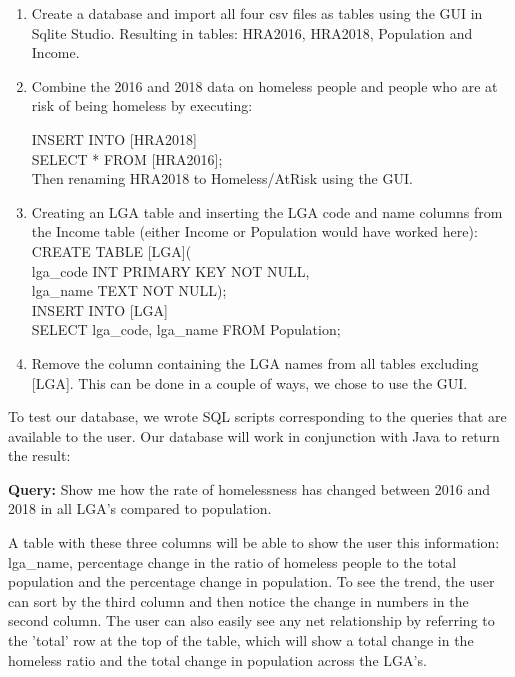 \documentclass[12pt, a4paper]{article}
\begin{document}
\begin{enumerate}
\item Create a database and import all four csv files as tables using the GUI in Sqlite Studio. Resulting in tables: HRA2016, HRA2018, Population and Income.
\item Combine the 2016 and 2018 data on homeless people and people who are at risk of being homeless by executing: 

\hspace*{10mm}%
INSERT INTO [HRA2018]\\
\hspace*{10mm}%
SELECT * FROM [HRA2016];\\
Then renaming HRA2018 to Homeless/AtRisk using the GUI.
\item Creating an LGA table and inserting the LGA code and name columns from the Income table (either Income or Population would have worked here):\\
\hspace*{10mm}%
CREATE TABLE [LGA](\\
\hspace*{10mm}%
lga\_code INT PRIMARY KEY NOT NULL,\\
\hspace*{10mm}%
lga\_name TEXT NOT NULL);\\
\hspace*{10mm}%
INSERT INTO [LGA]\\
\hspace*{10mm}%
SELECT lga\_code, lga\_name FROM Population;
\item Remove the column containing the LGA names from all tables excluding [LGA]. This can be done in a couple of ways, we chose to use the GUI.
\end{enumerate}
To test our database, we wrote SQL scripts corresponding to the queries that are available to the user. Our database will work in conjunction with Java to return the result: 

\textbf{Query:} Show me how the rate of homelessness has changed between 2016 and 2018 in all LGA's compared to population.

A table with these three columns will be able to show the user this information: lga\_name, percentage change in the ratio of homeless people to the total population and the percentage change in population. To see the trend, the user can sort by the third column and then notice the change in numbers in the second column. The user can also easily see any net relationship by referring to the 'total' row at the top of the table, which will show a total change in the homeless ratio and the total change in population across the LGA's. 
\end{document}
